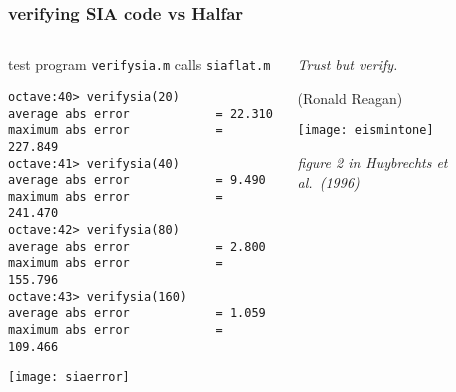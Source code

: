 \begin{frame}[fragile]
\frametitle{verifying SIA code vs Halfar}
\label{slide:verifysia}

\begin{columns}
\begin{column}{0.6\textwidth}
test program \texttt{verifysia.m} calls \texttt{siaflat.m}

\scriptsize
\begin{verbatim}
octave:40> verifysia(20)
average abs error            = 22.310
maximum abs error            = 227.849
octave:41> verifysia(40)
average abs error            = 9.490
maximum abs error            = 241.470
octave:42> verifysia(80)
average abs error            = 2.800
maximum abs error            = 155.796
octave:43> verifysia(160)
average abs error            = 1.059
maximum abs error            = 109.466
\end{verbatim}
\normalsize

\texttt{[image: siaerror]}
\end{column}

\begin{column}{0.4\textwidth}
\small
\emph{Trust but verify.}
\medskip

\scriptsize
(Ronald Reagan)

\bigskip\bigskip\bigskip

\texttt{[image: eismintone]}

\scriptsize \emph{figure 2 in Huybrechts et al.~(1996)}
\end{column}
\end{columns}
\end{frame}


